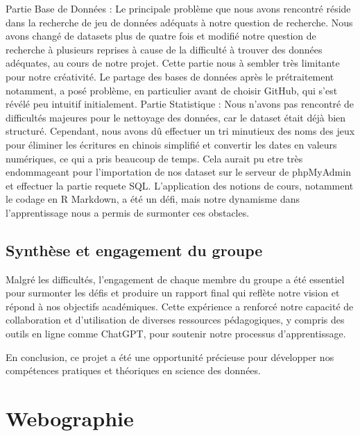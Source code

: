 \documentclass[mstat,12pt]{unswthesis}
\begin{document}
Partie Base de Données : \smallskip Le principale problème que nous
avons rencontré réside dans la recherche de jeu de données adéquats à
notre question de recherche. Nous avons changé de datasets plus de
quatre fois et modifié notre question de recherche à plusieurs reprises
à cause de la difficulté à trouver des données adéquates, au cours de
notre projet. Cette partie nous à sembler très limitante pour notre
créativité. Le partage des bases de données après le prétraitement
notamment, a posé problème, en particulier avant de choisir GitHub, qui
s'est révélé peu intuitif initialement. \medskip Partie Statistique :
\smallskip Nous n'avons pas rencontré de difficultés majeures pour le
nettoyage des données, car le dataset était déjà bien structuré.
Cependant, nous avons dû effectuer un tri minutieux des noms des jeux
pour éliminer les écritures en chinois simplifié et convertir les dates
en valeurs numériques, ce qui a pris beaucoup de temps. Cela aurait pu
etre très endommageant pour l'importation de nos dataset sur le serveur
de phpMyAdmin et effectuer la partie requete SQL. L'application des
notions de cours, notamment le codage en R Markdown, a été un défi, mais
notre dynamisme dans l'apprentissage nous a permis de surmonter ces
obstacles.

\hypertarget{synthuxe8se-et-engagement-du-groupe}{%
\section{Synthèse et engagement du
groupe}\label{synthuxe8se-et-engagement-du-groupe}}

Malgré les difficultés, l'engagement de chaque membre du groupe a été
essentiel pour surmonter les défis et produire un rapport final qui
reflète notre vision et répond à nos objectifs académiques. Cette
expérience a renforcé notre capacité de collaboration et d'utilisation
de diverses ressources pédagogiques, y compris des outils en ligne comme
ChatGPT, pour soutenir notre processus d'apprentissage.

En conclusion, ce projet a été une opportunité précieuse pour développer
nos compétences pratiques et théoriques en science des données.

\hypertarget{webographie}{%
\chapter*{Webographie}\label{webographie}}

\hypertarget{refs}{}
\begin{CSLReferences}{0}{0}
\end{CSLReferences}
\end{document}

